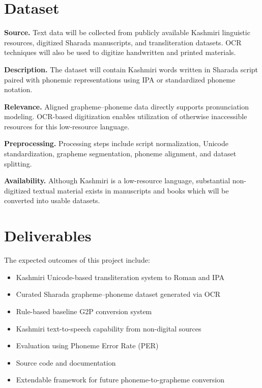 \documentclass[11pt]{article}
\begin{document}
\section{Dataset}

\textbf{Source.}
Text data will be collected from publicly available Kashmiri linguistic resources, digitized Sharada manuscripts, and transliteration datasets. OCR techniques will also be used to digitize handwritten and printed materials.

\textbf{Description.}
The dataset will contain Kashmiri words written in Sharada script paired with phonemic representations using IPA or standardized phoneme notation.

\textbf{Relevance.}
Aligned grapheme–phoneme data directly supports pronunciation modeling. OCR-based digitization enables utilization of otherwise inaccessible resources for this low-resource language.

\textbf{Preprocessing.}
Processing steps include script normalization, Unicode standardization, grapheme segmentation, phoneme alignment, and dataset splitting.

\textbf{Availability.}
Although Kashmiri is a low-resource language, substantial non-digitized textual material exists in manuscripts and books which will be converted into usable datasets.


\section{Deliverables}

The expected outcomes of this project include:

\begin{itemize}
\item Kashmiri Unicode-based transliteration system to Roman and IPA
\item Curated Sharada grapheme--phoneme dataset generated via OCR
\item Rule-based baseline G2P conversion system
\item Kashmiri text-to-speech capability from non-digital sources
\item Evaluation using Phoneme Error Rate (PER)
\item Source code and documentation
\item Extendable framework for future phoneme-to-grapheme conversion
\end{itemize}
\end{document}
